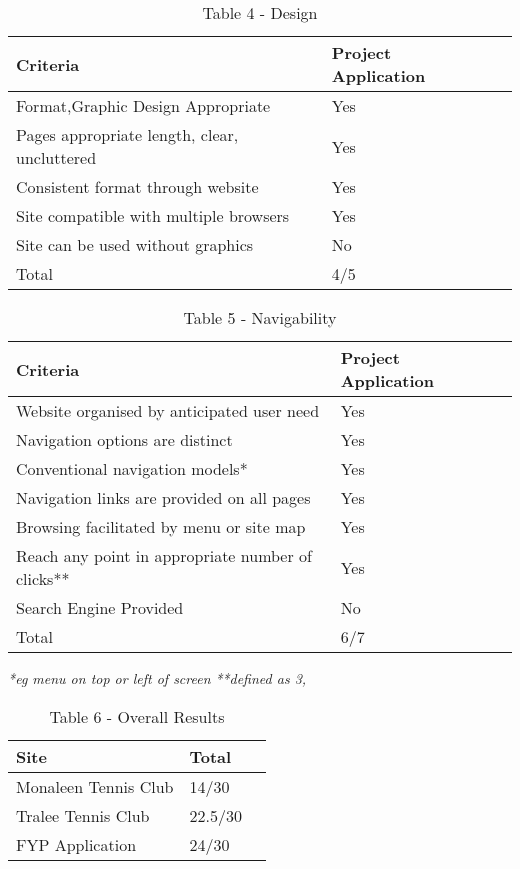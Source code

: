 \begin{table}[H]
\caption{Table 4 - Design}
\begin{center}
    \begin{tabular}{ | l | l | p{5cm} |}
    \hline
\textbf{Criteria} & \textbf{Project Application}\\ \hline
	Format,Graphic Design Appropriate & Yes \\ \hline
	Pages appropriate length, clear, uncluttered& Yes \\ \hline
	Consistent format through website & Yes \\ \hline
	Site compatible with multiple browsers & Yes\\ \hline
	Site can be used without graphics & No\\ \hline
	Total & 4/5 \\ \hline	
    \end{tabular}
\end{center}
\label{fig:projecttable4}
\end{table}

\begin{table}[H]
\caption{Table 5 - Navigability}
\begin{center}
    \begin{tabular}{ | l | l | p{5cm} |}
    \hline
	\textbf{Criteria} & \textbf{Project Application}\\ \hline
	Website organised by anticipated user need & Yes\\ \hline
	Navigation options are distinct& Yes \\ \hline
	Conventional navigation models*& Yes\\ \hline
	Navigation links are provided on all pages & Yes\\ \hline
	Browsing facilitated by menu or site map &Yes \\ \hline
	Reach any point in appropriate number of clicks** & Yes\\ \hline
	Search Engine Provided & No\\ \hline
	Total & 6/7 \\ \hline	
    \end{tabular}
\end{center}
\label{fig:projecttable5}
\end{table}
\textit{*eg menu on top or left of screen}\newline
\textit{**defined as 3,} \cite{smith2001applying}

\begin{table}[H]
\caption{Table 6 - Overall Results}
\begin{center}
    \begin{tabular}{ | l | l | p{5cm} |}
    \hline
	Site & Total\\ \hline
	Monaleen Tennis Club & 14/30\\ \hline
	Tralee Tennis Club & 22.5/30\\ \hline
	FYP Application & 24/30\\ \hline	
    \end{tabular}
\end{center}
\label{fig:projecttable6}
\end{table}

